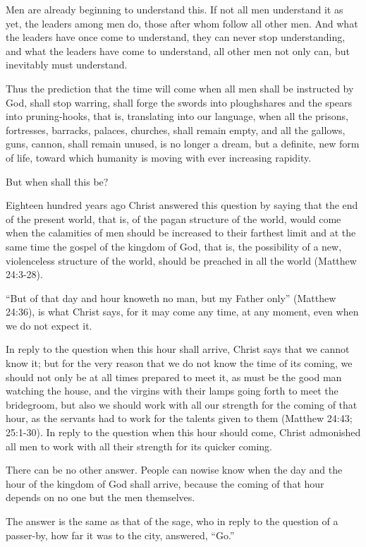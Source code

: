 \documentclass{book}
\begin{document}
Men are already beginning to understand this. If not all men understand it as yet, the leaders among men do, those after whom follow all other men. And what the leaders have once come to understand, they can never stop understanding, and what the leaders have come to understand, all other men not only can, but inevitably must understand.

Thus the prediction that the time will come when all men shall be instructed by God, shall stop warring, shall forge the swords into ploughshares and the spears into pruning-hooks, that is, translating into our language, when all the prisons, fortresses, barracks, palaces, churches, shall remain empty, and all the gallows, guns, cannon, shall remain unused, is no longer a dream, but a definite, new form of life, toward which humanity is moving with ever increasing rapidity.

But when shall this be?

Eighteen hundred years ago Christ answered this question by saying that the end of the present world, that is, of the pagan structure of the world, would come when the calamities of men should be increased to their farthest limit and at the same time the gospel of the kingdom of God, that is, the possibility of a new, violenceless structure of the world, should be preached in all the world (Matthew 24:3-28).

“But of that day and hour knoweth no man, but my Father only” (Matthew 24:36), is what Christ says, for it may come any time, at any moment, even when we do not expect it.

In reply to the question when this hour shall arrive, Christ says that we cannot know it; but for the very reason that we do not know the time of its coming, we should not only be at all times prepared to meet it, as must be the good man watching the house, and the virgins with their lamps going forth to meet the bridegroom, but also we should work with all our strength for the coming of that hour, as the servants had to work for the talents given to them (Matthew 24:43; 25:1-30). In reply to the question when this hour should come, Christ admonished all men to work with all their strength for its quicker coming.

There can be no other answer. People can nowise know when the day and the hour of the kingdom of God shall arrive, because the coming of that hour depends on no one but the men themselves.

The answer is the same as that of the sage, who in reply to the question of a passer-by, how far it was to the city, answered, “Go.”
\end{document}
